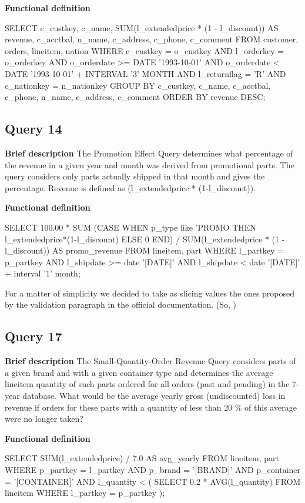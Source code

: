 \textbf{Functional definition}
\begin{sql}
SELECT
    c_custkey,
    c_name,
    SUM(l_extendedprice * (1 - l_discount)) AS revenue,
    c_acctbal,
    n_name,
    c_address,
    c_phone,
    c_comment
FROM
    customer,
    orders,
    lineitem,
    nation
WHERE
    c_custkey = o_custkey
    AND l_orderkey = o_orderkey
    AND o_orderdate >= DATE '1993-10-01'
    AND o_orderdate < DATE '1993-10-01' + INTERVAL '3' MONTH
    AND l_returnflag = 'R'
    AND c_nationkey = n_nationkey
GROUP BY
    c_custkey,
    c_name,
    c_acctbal,
    c_phone,
    n_name,
    c_address,
    c_comment
ORDER BY
    revenue DESC;
\end{sql}


\subsection{Query 14}
\textbf{Brief description}
The Promotion Effect Query determines what percentage of the revenue in a given year and month was derived from 
promotional parts. The query considers only parts actually shipped in that month and gives the percentage. Revenue 
is defined as (l\_extendedprice * (1-l\_discount)).


\textbf{Functional definition}
\begin{sql}
SELECT 
    100.00 * SUM (CASE WHEN p_type like 'PROMO%
                  THEN l_extendedprice*(1-l_discount) 
                  ELSE 0 END) / SUM(l_extendedprice * (1 - l_discount)) 
    AS promo_revenue
FROM 
    lineitem, 
    part
WHERE 
    l_partkey = p_partkey
    AND l_shipdate >= date '[DATE]'
    AND l_shipdate < date '[DATE]' + interval '1' month;

\end{sql}

For a matter of simplicity we decided to take as slicing values the ones proposed by the validation paragraph in the official documentation. (So, )


\subsection{Query 17}
\textbf{Brief description}
The Small-Quantity-Order Revenue Query considers parts of a given brand and with a given container type and 
determines the average lineitem quantity of such parts ordered for all orders (past and pending) in the 7-year database. What would be the average yearly gross (undiscounted) loss in revenue if orders for these parts with a quantity 
of less than 20 \% of this average were no longer taken?


\textbf{Functional definition}
\begin{sql}
SELECT
    SUM(l_extendedprice) / 7.0 AS avg_yearly
FROM 
    lineitem, 
    part
WHERE 
    p_partkey = l_partkey
    AND p_brand = '[BRAND]'
    AND p_container = '[CONTAINER]'
    AND l_quantity < ( 
                        SELECT 
                            0.2 * AVG(l_quantity)
                        FROM 
                            lineitem
                        WHERE 
                            l_partkey = p_partkey
                      );

\end{sql}
